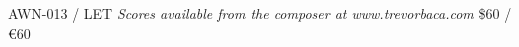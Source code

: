 \documentclass{article}
\begin{document}
\null \vfill

AWN-013 / LET \hfill
\textit{Scores available from the composer at www.trevorbaca.com}
\hfill \$60 / \euro 60
\end{document}
